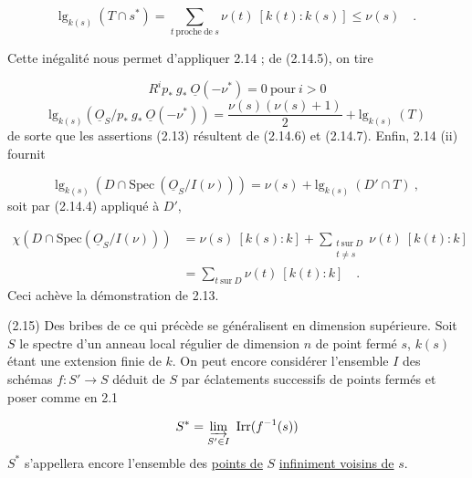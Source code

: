 \begin{equation*}
\mathrm{lg}_{k(s)}\ (T \cap s^*) = \sum_{t\ \mathrm{proche\ de}\ s} \nu(t)\ [k(t) : k(s)] \leq \nu(s) \quad .
\end{equation*}


Cette inégalité nous permet d'appliquer 2.14 ; de (2.14.5), on tire

\begin{equation*}
R^i p_* \ g_* \ \underline{O}(-\nu^*) = 0 \ \mathrm{pour}\ i > 0
\end{equation*}
\begin{equation*}
\mathrm{lg}_{k(s)}(\underline{O}_S/p_* \ g_* \ \underline{O}(-\nu^*)) = \frac{\nu(s)(\nu(s)+1)}{2} + \mathrm{lg}_{k(s)}\ (T)
\end{equation*}
de sorte que les assertions (2.13) résultent de (2.14.6) et (2.14.7). Enfin, 2.14 (ii) fournit

\begin{equation*}
\mathrm{lg}_{k(s)}\ (D \cap \mathrm{Spec}\ (\underline{O}_S/I(\nu))) = \nu(s) + \mathrm{lg}_{k(s)}\ (D' \cap T) \ ,
\end{equation*}
soit par (2.14.4) appliqué à $D'$,

\begin{equation*}
\begin{aligned}
\chi(D \cap \mathrm{Spec}(\underline{O}_S/I(\nu))) &= \nu(s)\ [k(s) : k] + \sum_{\substack{t\ \mathrm{sur}\ D\\ t\ne s}} \nu(t)\ [k(t) : k] \\
&= \sum_{t\ \mathrm{sur}\ D} \nu(t)\ [k(t) : k] \quad .
\end{aligned}
\end{equation*}
Ceci achève la démonstration de 2.13.

(2.15) Des bribes de ce qui précède se généralisent en dimension supérieure. Soit $S$ le spectre d'un anneau local régulier de dimension $n$ de point fermé $s$, $k(s)$ étant une extension finie de $k$. On peut encore considérer l'ensemble $I$ des schémas $f : S' \longrightarrow S$ déduit de $S$ par éclatements successifs de points fermés et poser comme en 2.1

\begin{equation*}
S^* = \varinjlim_{S' \in I} \ \mathrm{Irr}(f^{-1}(s))
\end{equation*}
$S^*$ s'appellera encore l'ensemble des \underline{points de} $S$ \underline{infiniment voisins de} $s$.

